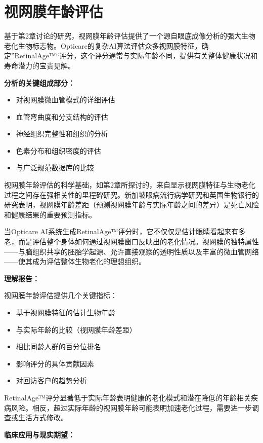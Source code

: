 \documentclass[
  Letterpaper,
]{scrbook}
\providecommand{\tightlist}{%
  \setlength{\itemsep}{0pt}\setlength{\parskip}{0pt}}\usepackage{longtable,booktabs,array}
\begin{document}
\section{视网膜年龄评估}\label{ux89c6ux7f51ux819cux5e74ux9f84ux8bc4ux4f30}

基于第2章讨论的研究，视网膜年龄评估提供了一个源自眼底成像分析的强大生物老化生物标志物。Opticare的复杂AI算法评估众多视网膜特征，确定''RetinalAge™``评分，这个评分通常与实际年龄不同，提供有关整体健康状况和寿命潜力的宝贵见解。

\textbf{分析的关键组成部分：}

\begin{itemize}
\tightlist
\item
  对视网膜微血管模式的详细评估
\item
  血管弯曲度和分支结构的评估
\item
  神经组织完整性和组织的分析
\item
  色素分布和组织密度的评估
\item
  与广泛规范数据库的比较
\end{itemize}

视网膜年龄评估的科学基础，如第2章所探讨的，来自显示视网膜特征与生物老化过程之间存在强相关性的里程碑研究。新加坡眼病流行病学研究和英国生物银行的研究表明，视网膜年龄差距（预测视网膜年龄与实际年龄之间的差异）是死亡风险和健康结果的重要预测指标。

当Opticare
AI系统生成RetinalAge™评分时，它不仅仅是估计眼睛看起来有多老，而是评估整个身体如何通过视网膜窗口反映出的老化情况。视网膜的独特属性------与脑组织共享的胚胎学起源、允许直接观察的透明性质以及丰富的微血管网络------使其成为评估整体生物老化的理想组织。

\textbf{理解报告：}

视网膜年龄评估提供几个关键指标：

\begin{itemize}
\tightlist
\item
  基于视网膜特征的估计生物年龄
\item
  与实际年龄的比较（视网膜年龄差距）
\item
  相比同龄人群的百分位排名
\item
  影响评分的具体贡献因素
\item
  对回访客户的趋势分析
\end{itemize}

RetinalAge™评分显著低于实际年龄表明健康的老化模式和潜在降低的年龄相关疾病风险。相反，超过实际年龄的视网膜年龄可能表明加速老化过程，需要进一步调查或生活方式修改。

\textbf{临床应用与现实期望：}
\end{document}
